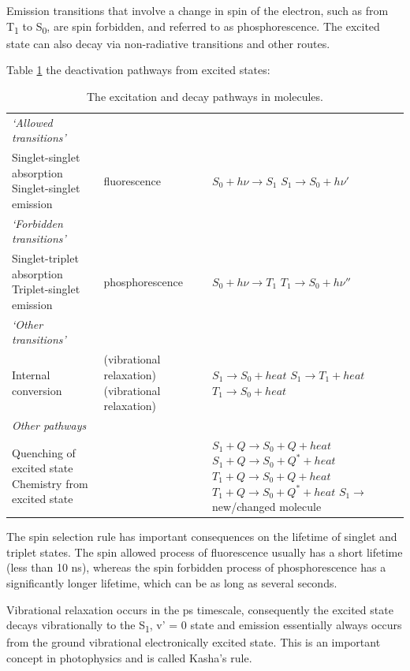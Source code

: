 \documentclass[
]{book}
\begin{document}
Emission transitions that involve a change in spin of the electron, such as from T\textsubscript{1} to S\textsubscript{0}, are spin forbidden, and referred to as phosphorescence. The excited state can also decay via non-radiative transitions and other routes.

Table \ref{tab:phototrans} the deactivation pathways from excited states:

\begin{longtable}[]{@{}
  >{\raggedright\arraybackslash}p{}
  >{\raggedright\arraybackslash}p{}
  >{\raggedright\arraybackslash}p{}@{}}
\caption{\label{tab:phototrans} The excitation and decay pathways in molecules.}\tabularnewline
\toprule()
\endhead
\emph{`Allowed transitions'} & & \\
Singlet-singlet absorption Singlet-singlet emission & fluorescence & \(S_0 + h \nu \longrightarrow S_1\) \(S_1 \longrightarrow S_0 + h \nu '\) \\
\emph{`Forbidden transitions'} & & \\
Singlet-triplet absorption Triplet-singlet emission & phosphorescence & \(S_0 + h \nu \longrightarrow T_1\) \(T_1 \longrightarrow S_0 + h \nu ''\) \\
\emph{`Other transitions'} & & \\
Internal conversion & (vibrational relaxation) (vibrational relaxation) & \(S_1 \longrightarrow S_0 + heat\) \(S_1 \longrightarrow T_1 + heat\) \(T_1 \longrightarrow S_0 + heat\) \\
\emph{Other pathways} & & \\
Quenching of excited state Chemistry from excited state & & \(S_1 + Q \longrightarrow S_0 + Q +heat\) \(S_1 + Q \longrightarrow S_0 + Q^\ast +heat\) \(T_1 + Q \longrightarrow S_0 + Q +heat\) \(T_1 + Q \longrightarrow S_0 + Q^\ast +heat\) \(S_1 \longrightarrow\) new/changed molecule \\
\bottomrule()
\end{longtable}

The spin selection rule has important consequences on the lifetime of singlet and triplet states. The spin allowed process of fluorescence usually has a short lifetime (less than 10 ns), whereas the spin forbidden process of phosphorescence has a significantly longer lifetime, which can be as long as several seconds.

Vibrational relaxation occurs in the ps timescale, consequently the excited state decays vibrationally to the S\textsubscript{1}, v' = 0 state and emission essentially always occurs from the ground vibrational electronically excited state. This is an important concept in photophysics and is called Kasha's rule.
\end{document}
